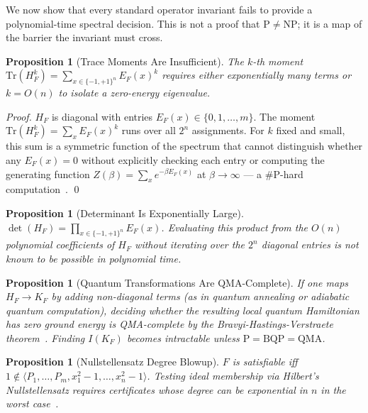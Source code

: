 \documentclass[11pt,letterpaper]{article}
\newtheorem{proposition}[theorem]{Proposition}
\begin{document}
We now show that every standard operator invariant fails to provide
a polynomial-time spectral decision.  This is not a proof that $\mathrm{P} \neq \mathrm{NP}$;
it is a map of the barrier the invariant must cross.

\begin{proposition}[Trace Moments Are Insufficient]
\label{prop:trace}
The $k$-th moment $\mathrm{Tr}(H_F^k) = \sum_{x \in \{-1,+1\}^n} E_F(x)^k$
requires either exponentially many terms or $k = O(n)$ to isolate a
zero-energy eigenvalue.
\end{proposition}
\begin{proof}
$H_F$ is diagonal with entries $E_F(x) \in \{0, 1, \ldots, m\}$.
The moment $\mathrm{Tr}(H_F^k) = \sum_x E_F(x)^k$ runs over all $2^n$
assignments.  For $k$ fixed and small, this sum is a symmetric function of
the spectrum that cannot distinguish whether any $E_F(x) = 0$ without
explicitly checking each entry or computing the generating function
$Z(\beta) = \sum_x e^{-\beta E_F(x)}$ at $\beta \to \infty$ --- a
\#P-hard computation~\cite{jerrum1993}.  \qed
\end{proof}

\begin{proposition}[Determinant Is Exponentially Large]
\label{prop:det}
$\det(H_F) = \prod_{x \in \{-1,+1\}^n} E_F(x)$.  Evaluating this
product from the $O(n)$ polynomial coefficients of $H_F$ without iterating
over the $2^n$ diagonal entries is not known to be possible in polynomial time.
\end{proposition}

\begin{proposition}[Quantum Transformations Are QMA-Complete]
If one maps $H_F \to K_F$ by adding non-diagonal terms (as in quantum
annealing or adiabatic quantum computation), deciding whether the resulting
local quantum Hamiltonian has zero ground energy is QMA-complete by the
Bravyi-Hastings-Verstraete theorem~\cite{bravyi2006}.  Finding $I(K_F)$
becomes intractable unless $\mathrm{P} = \mathrm{BQP} = \mathrm{QMA}$.
\end{proposition}

\begin{proposition}[Nullstellensatz Degree Blowup]
$F$ is satisfiable iff $1 \notin \langle P_1, \ldots, P_m, x_1^2-1, \ldots, x_n^2-1 \rangle$.
Testing ideal membership via Hilbert's Nullstellensatz requires certificates
whose degree can be exponential in $n$ in the worst case~\cite{beame1992}.
\end{proposition}
\end{document}
